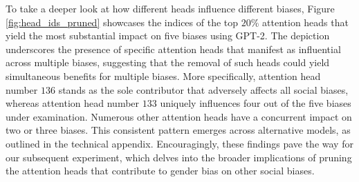 \documentclass[letterpaper]{article} %
\newcommand{\goncalo}[1]
{\textcolor{orange}{{\bf}{\em #1}{\bf}}}
\begin{document}
To take a deeper look at how different heads influence different biases, Figure \ref{fig:head_ids_pruned} showcases the indices of the top $20$\% attention heads that yield the most substantial impact on five biases using GPT-2. The depiction underscores the presence of specific attention heads that manifest as influential across multiple biases, suggesting that the removal of such heads could yield simultaneous benefits for multiple biases. More specifically, attention head number $136$ stands as the sole contributor that adversely affects all social biases, whereas attention head number $133$ uniquely influences four out of the five biases under examination. Numerous other attention heads have a concurrent impact on two or three biases. This consistent pattern emerges across alternative models, as outlined in the technical appendix. Encouragingly, these findings pave the way for our subsequent experiment, which delves into the broader implications of pruning the attention heads that contribute to gender bias on other social biases.





\end{document}
